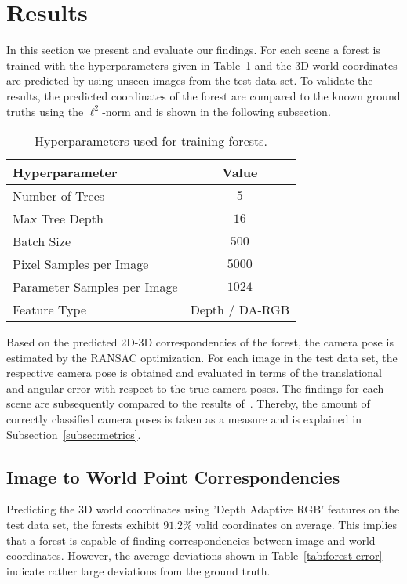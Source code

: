 \documentclass[final]{cvpr}
\begin{document}
\section{Results}
In this section we present and evaluate our findings. For each scene a forest is trained with the hyperparameters given in 
Table~\ref{tab:params} and the 3D world coordinates are predicted by using unseen images from the test data set. To 
validate the results, the predicted coordinates of the forest are compared to the known ground truths using the $\ell^2$-norm and
is shown in the following subsection.
\begin{table}[h!]
	\begin{center}
	\begin{tabular}{|l|c|}
	\hline
	Hyperparameter & Value \\
	\hline\hline
	Number of Trees & $5$ \\
	Max Tree Depth & $16$ \\
	Batch Size & $500$ \\
	Pixel Samples per Image & $5000$ \\
	Parameter Samples per Image  & $1024$ \\
	Feature Type & Depth / DA-RGB \\
	\hline
	\end{tabular}
	\end{center}
	\label{tab:params}
	\caption{Hyperparameters used for training forests.}
\end{table}

Based on the predicted 2D-3D correspondencies of the forest, the camera pose is estimated by the RANSAC optimization.
For each image in the test data set, the respective camera pose is obtained and evaluated in terms of the translational 
and angular error with respect to the true camera poses. The findings for each scene are subsequently compared
to the results of~\cite{shotton2013}. Thereby, the amount of correctly classified camera poses is taken as a measure 
and is explained in Subsection~\ref{subsec:metrics}.




\subsection{Image to World Point Correspondencies}
Predicting the 3D world coordinates using 'Depth Adaptive RGB' features on the test data set, the forests exhibit 
$91.2\%$ valid coordinates on average. This implies that a forest is capable of finding correspondencies between 
image and world coordinates. However, the average deviations shown in Table~\ref{tab:forest-error} indicate rather 
large deviations from the ground truth. %
\end{document}

